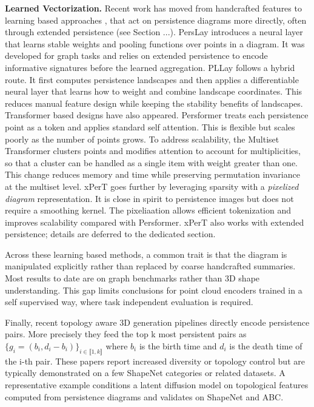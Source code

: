 \textbf{Learned Vectorization.} Recent work has moved from handcrafted features to learning based approaches \cite{adaptive_topological_feature},\cite{topological_signature} that act on persistence diagrams more directly, often through extended persistence \cite{extended_persistence} (see Section ...). PersLay \cite{perslay} introduces a neural layer that learns stable weights and pooling functions over points in a diagram. It was developed for graph tasks and relies on extended persistence to encode informative signatures before the learned aggregation. PLLay \cite{pllay} follows a hybrid route. It first computes persistence landscapes and then applies a differentiable neural layer that learns how to weight and combine landscape coordinates. This reduces manual feature design while keeping the stability benefits of landscapes. Transformer based designs have also appeared. Persformer \cite{persformer} treats each persistence point as a token and applies standard self attention. This is flexible but scales poorly as the number of points grows. To address scalability, the Multiset Transformer \cite{multiset_transformer} clusters points and modifies attention to account for multiplicities, so that a cluster can be handled as a single item with weight greater than one. This change reduces memory and time while preserving permutation invariance at the multiset level. xPerT \cite{xpert} goes further by leveraging sparsity with a \textit{pixelized diagram} representation. It is close in spirit to persistence images but does not require a smoothing kernel. The pixeliaation allows efficient tokenization and improves scalability compared with Persformer. xPerT also works with extended persistence; details are deferred to the dedicated section.

Across these learning based methods, a common trait is that the diagram is manipulated explicitly rather than replaced by coarse handcrafted summaries. Most results to date are on graph benchmarks rather than 3D shape understanding. This gap limits conclusions for point cloud encoders trained in a self supervised way, where task independent evaluation is required.

Finally, recent topology aware 3D generation pipelines \cite{topology_aware_latent_diffusion} directly encode persistence pairs. More precisely they feed the top k most persistent pairs as $\{g_i=(b_i, d_i-b_i)\}_{i \in \llbracket 1,k\rrbracket}$ where $b_i$ is the birth time and $d_i$ is the death time of the i-th pair. These papers report increased diversity or topology control but are typically demonstrated on a few ShapeNet categories or related datasets. A representative example conditions a latent diffusion model on topological features computed from persistence diagrams and validates on ShapeNet and ABC.

